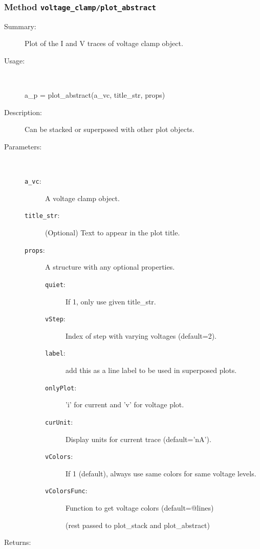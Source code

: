 \subsubsection[Method \texttt{plot\_abstract}]{Method \texttt{voltage\_clamp/plot\_abstract}}%
%
\label{ref_voltage_clamp__plot_abstract}%
\hypertarget{ref_voltage_clamp__plot_abstract}{}%
\begin{description}
\item[Summary:]Plot of the I and V traces of voltage clamp object.
%
\item[Usage:]~%
\begin{lyxcode}%
a\_p = plot\_abstract(a\_vc, title\_str, props)
%
\end{lyxcode}%
%
\item[Description:]%
Can be stacked or superposed with other plot objects.
\item[Parameters:]~
\begin{description}%
\item[\texttt{a\_vc}:]
 A voltage clamp object.
\item[\texttt{title\_str}:]
 (Optional) Text to appear in the plot title.
\item[\texttt{props}:]
 A structure with any optional properties.
\begin{description}%
\item[\texttt{quiet}:]
 If 1, only use given title\_str.
\item[\texttt{vStep}:]
 Index of step with varying voltages (default=2).
\item[\texttt{label}:]
 add this as a line label to be used in superposed plots.
\item[\texttt{onlyPlot}:]
 'i' for current and 'v' for voltage plot.
\item[\texttt{curUnit}:]
 Display units for current trace (default='nA').
\item[\texttt{vColors}:]
 If 1 (default), always use same colors for same voltage levels.
\item[\texttt{vColorsFunc}:]
 Function to get voltage colors (default=@lines)

(rest passed to plot\_stack and plot\_abstract)
\end{description}%
\end{description}%
%
\item[Returns:
]~


\end{description}
